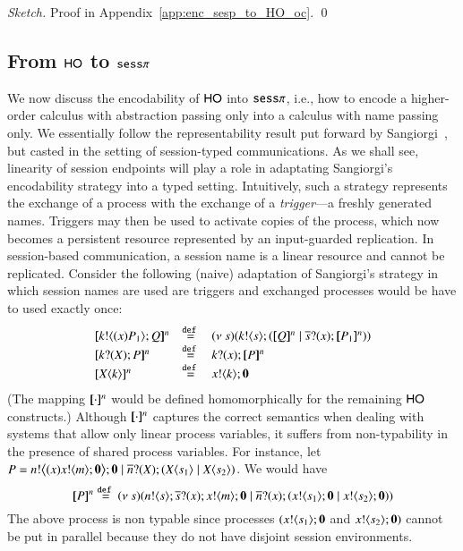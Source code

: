 \begin{proof}[Sketch]
	Proof in Appendix~\ref{app:enc_sesp_to_HO_oc}.
	\qed
\end{proof}

\subsection{From $\mathsf{HO}$ to $\mathtt{sess}\pi$}

We now discuss the encodability of  $\mathsf{HO}$ into $\mathtt{sess}\pi$, 
i.e., how to encode a higher-order calculus with abstraction passing only
into a calculus with name passing only. 
We essentially follow the representability result put forward by 
Sangiorgi~\cite{San92,SaWabook}, but casted in the setting of session-typed communications. 
As we shall see, linearity of session endpoints will play a role in adaptating Sangiorgi's 
encodability strategy into a typed setting. 
Intuitively, such a strategy represents the exchange of a process with the exchange of 
a \emph{trigger}---a freshly generated names. 
Triggers may then be used to activate copies of the process, which now becomes a persistent 
resource represented by an input-guarded replication. In session-based communication, a session name 
is a linear resource and cannot be replicated. Consider the following (naive) adaptation of 
Sangiorgi's strategy in which session names are used are triggers and exchanged processes would be have to used exactly once:
\[
	\begin{array}{lcl}
		\pmap{\bout{k}{\abs{x} P_1} Q}{n} & \defeq &  \newsp{s}{\bout{k}{s} (\pmap{Q}{n} \Par \binp{\dual{s}}{x} \pmap{P_1}{n})} \\
		\pmap{\binp{k}{X} P}{n} & \defeq& \binp{k}{x} \pmap{P}{n}\\
		\pmap{\appl{X}{k}}{n} & \defeq & \bout{x}{k} \inact
	\end{array}
	\]
%
%
(The mapping $[\!\![\cdot]\!\!]^n$ would be defined homomorphically for the remaining $\mathsf{HO}$ constructs.)
Although $[\!\![\cdot]\!\!]^n$ captures the correct semantics when
dealing with systems that allow only linear process variables,
it suffers from non-typability in the presence
of shared process variables. For instance,
let $P = n ! \big\langle (x)x ! \langle m \rangle ;\mathbf{0} \big\rangle ; \mathbf{0} \;|\; \overline{n} ? (X) ; (X\langle s_1 \rangle \;|\; X\langle s_2 \rangle)$.
We would have
\[
	[\!\![P]\!\!]^n \stackrel{\mathtt{def}\ }{=}
	(\nu\ s)(n ! \langle s \rangle ; \overline{s} ? (x) ; x ! \langle m \rangle ; \mathbf{0} \;|\; \overline{n} ? (x) ; (x ! \langle s_1 \rangle ; \mathbf{0} \;|\; x ! \langle s_2 \rangle ; \mathbf{0}))
\]
The above process is non typable since processes $(x ! \langle s_1 \rangle ; \mathbf{0}$ and $x ! \langle s_2 \rangle ; \mathbf{0})$
cannot be put in parallel because they do not have disjoint session environments.

